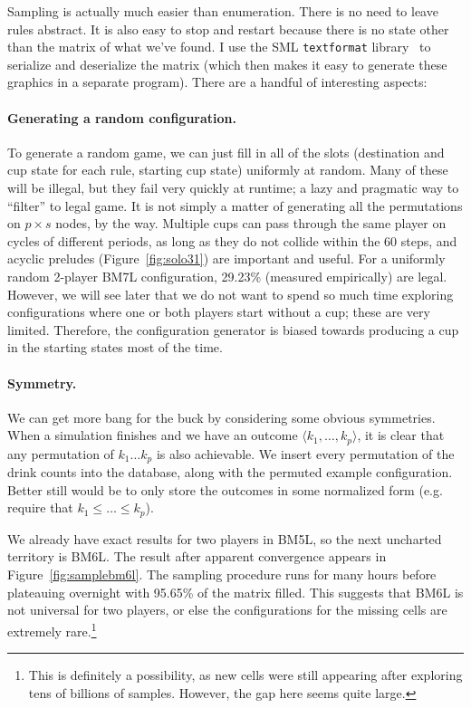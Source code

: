 \documentclass[twocolumn]{article}
\begin{document}
Sampling is actually much easier than enumeration. There is no need to
leave rules abstract. It is also easy to stop and restart because
there is no state other than the matrix of what we've found. I use the
SML {\tt textformat} library~\cite{textformat} to serialize and
deserialize the matrix (which then makes it easy to generate these
graphics in a separate program). There are a handful of interesting
aspects:

\paragraph{Generating a random configuration.} To generate a random
game, we can just fill in all of the slots (destination and cup state
for each rule, starting cup state) uniformly at random. Many of these
will be illegal, but they fail very quickly at runtime; a lazy and
pragmatic way to ``filter'' to legal game. It is not simply a matter
of generating all the permutations on $p \times s$ nodes, by the way.
Multiple cups can pass through the same player on cycles of different
periods, as long as they do not collide within the 60 steps, and
acyclic preludes (Figure~\ref{fig:solo31}) are important and useful.
For a uniformly random 2-player BM7L configuration, 29.23\% (measured
empirically) are legal. However, we will see later that we do not want
to spend so much time exploring configurations where one or both
players start without a cup; these are very limited. Therefore, the
configuration generator is biased towards producing a cup in the
starting states most of the time.

\paragraph{Symmetry.} We can get more bang for the buck by considering
some obvious symmetries. When a simulation finishes and we have an
outcome $\langle k_1, \ldots, k_p \rangle$, it is clear that any
permutation of $k_1 \ldots k_p$ is also achievable. We insert every
permutation of the drink counts into the database, along with the
permuted example configuration. Better still would be to only store
the outcomes in some normalized form (e.g. require that $k_1 \leq
\ldots \leq k_p$).

We already have exact results for two players in BM5L, so the next
uncharted territory is BM6L. The result after apparent convergence
appears in Figure~\ref{fig:samplebm6l}. The sampling procedure runs
for many hours before plateauing overnight with 95.65\% of the matrix
filled. This suggests that BM6L is not universal for two players, or
else the configurations for the missing cells are extremely
rare.\!\footnote{This is definitely a possibility, as new cells were
still appearing after exploring tens of billions of samples. However,
the gap here seems quite large.}
\end{document}
